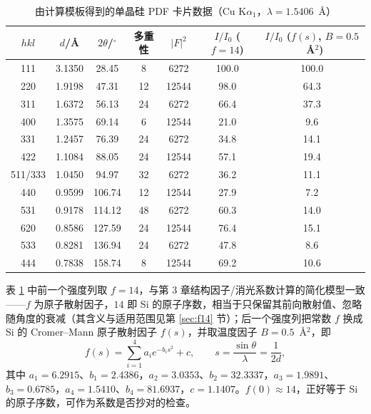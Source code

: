 \begin{table}[H]
  \centering
  \caption{由计算模板得到的单晶硅 PDF 卡片数据（Cu K$\alpha_1$，$\lambda=1.5406$~\AA）}
  \label{tab:pdf-card}
  \small
  \setlength{\tabcolsep}{3pt}
  \renewcommand{\arraystretch}{1.05}
  \begin{tabular}{ccccccc}
    \toprule
    $hkl$ & $d$/\AA & $2\theta$/$^\circ$ & 多重性 & $|F|^2$ & $I/I_0$ ($f=14$) & $I/I_0$ ($f(s)$, $B=0.5$~\AA$^2$) \\
    \midrule
    111 & 3.1350 & 28.45 & 8  & 6272  & 100.0 & 100.0 \\
    220 & 1.9198 & 47.31 & 12 & 12544 & 98.0  & 64.3  \\
    311 & 1.6372 & 56.13 & 24 & 6272  & 66.4  & 37.3  \\
    400 & 1.3575 & 69.14 & 6  & 12544 & 21.0  & 9.6   \\
    331 & 1.2457 & 76.39 & 24 & 6272  & 34.8  & 14.1  \\
    422 & 1.1084 & 88.05 & 24 & 12544 & 57.1  & 19.4  \\
    511/333 & 1.0450 & 94.97 & 32 & 6272 & 36.2 & 11.1 \\
    440 & 0.9599 & 106.74 & 12 & 12544 & 27.9 & 7.2  \\
    531 & 0.9178 & 114.12 & 48 & 6272 & 60.3 & 14.0  \\
    620 & 0.8586 & 127.59 & 24 & 12544 & 76.4 & 15.1 \\
    533 & 0.8281 & 136.94 & 24 & 6272 & 47.8 & 8.6  \\
    444 & 0.7838 & 158.74 & 8  & 12544 & 69.2 & 10.6 \\
    \bottomrule
  \end{tabular}
\end{table}

表 \ref{tab:pdf-card} 中前一个强度列取 $f=14$，与第 3 章结构因子/消光系数计算的简化模型一致——$f$ 为原子散射因子，$14$ 即 Si 的原子序数，相当于只保留其前向散射值、忽略随角度的衰减（其含义与适用范围见第 \ref{sec:f14} 节）；后一个强度列把常数 $f$ 换成 Si 的 Cromer--Mann 原子散射因子 $f(s)$，并取温度因子 $B=0.5$~\AA$^2$，即
\begin{equation}
f(s)=\sum_{i=1}^{4}a_i e^{-b_i s^2}+c,\qquad s=\frac{\sin\theta}{\lambda}=\frac{1}{2d},
\label{eq:cromer-mann}
\end{equation}
其中 $a_1=6.2915$、$b_1=2.4386$，$a_2=3.0353$、$b_2=32.3337$，$a_3=1.9891$、$b_3=0.6785$，$a_4=1.5410$、$b_4=81.6937$，$c=1.1407$。$f(0)\approx14$，正好等于 Si 的原子序数，可作为系数是否抄对的检查。

